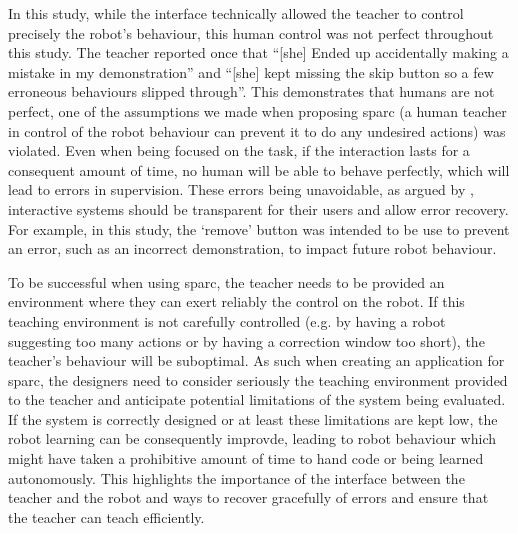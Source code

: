 In this study, while the interface technically allowed the teacher to control precisely the robot's behaviour, this human control was not perfect throughout this study. %
The teacher reported once that ``[she] Ended up accidentally making a mistake in my demonstration'' and ``[she] kept missing the skip button so a few erroneous behaviours slipped through''. This demonstrates that humans are not perfect, one of the assumptions we made when proposing \gls{sparc} (a human teacher in control of the robot behaviour can prevent it to do any undesired actions) was violated. Even when being focused on the task, if the interaction lasts for a consequent amount of time, no human will be able to behave perfectly, which will lead to errors in supervision. These errors being unavoidable, as argued by \cite{rasmussen1989coping}, interactive systems should be transparent for their users and allow error recovery. For example, in this study, the `remove' button was intended to be use to prevent an error, such as an incorrect demonstration, to impact future robot behaviour. 


To be successful when using \gls{sparc}, the teacher needs to be provided an environment where they can exert reliably the control on the robot. If this teaching environment is not carefully controlled (e.g. by having a robot suggesting too many actions or by having a correction window too short), the teacher's behaviour will be suboptimal. As such when creating an application for \gls{sparc}, the designers need to consider seriously the teaching environment provided to the teacher and anticipate potential limitations of the system being evaluated. If the system is correctly designed or at least these limitations are kept low, the robot learning can be consequently improvde, leading to robot behaviour which might have taken a prohibitive amount of time to hand code or being learned autonomously. This highlights the importance of the interface between the teacher and the robot and ways to recover gracefully of errors and ensure that the teacher can teach efficiently. 

